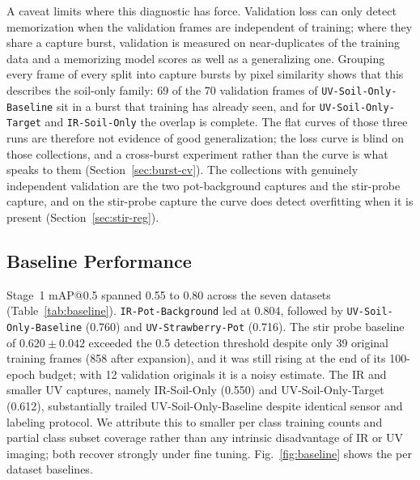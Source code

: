 ﻿\documentclass[journal]{IEEEtran}
\begin{document}
A caveat limits where this diagnostic has force. Validation loss can only detect memorization when the validation frames are independent of training; where they share a capture burst, validation is measured on near-duplicates of the training data and a memorizing model scores as well as a generalizing one. Grouping every frame of every split into capture bursts by pixel similarity shows that this describes the soil-only family: 69 of the 70 validation frames of \texttt{UV-Soil-Only-Baseline} sit in a burst that training has already seen, and for \texttt{UV-Soil-Only-Target} and \texttt{IR-Soil-Only} the overlap is complete. The flat curves of those three runs are therefore not evidence of good generalization; the loss curve is blind on those collections, and a cross-burst experiment rather than the curve is what speaks to them (Section~\ref{sec:burst-cv}). The collections with genuinely independent validation are the two pot-background captures and the stir-probe capture, and on the stir-probe capture the curve does detect overfitting when it is present (Section~\ref{sec:stir-reg}).

\subsection{Baseline Performance}
Stage~1 mAP@0.5 spanned 0.55 to 0.80 across the seven datasets (Table~\ref{tab:baseline}). \texttt{IR-Pot-Background} led at 0.804, followed by \texttt{UV-Soil-Only-Baseline} (0.760) and \texttt{UV-Strawberry-Pot} (0.716). The stir probe baseline of $0.620 \pm 0.042$ exceeded the 0.5 detection threshold despite only 39 original training frames (858 after expansion), and it was still rising at the end of its 100-epoch budget; with 12 validation originals it is a noisy estimate. The IR and smaller UV captures, namely IR-Soil-Only (0.550) and UV-Soil-Only-Target (0.612), substantially trailed UV-Soil-Only-Baseline despite identical sensor and labeling protocol. We attribute this to smaller per class training counts and partial class subset coverage rather than any intrinsic disadvantage of IR or UV imaging; both recover strongly under fine tuning. Fig.~\ref{fig:baseline} shows the per dataset baselines.
\end{document}
